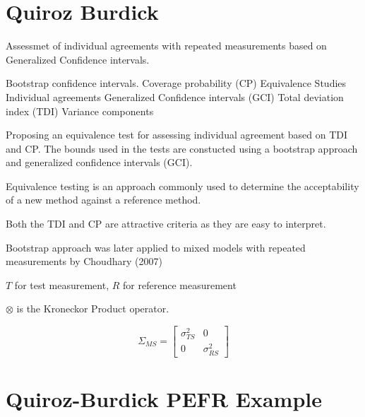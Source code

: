 \section{Quiroz Burdick}
Assessmet of individual agreements with repeated measurements based on Generalized Confidence intervals.


Bootstrap confidence intervals.
Coverage probability (CP)
Equivalence Studies
Individual agreements
Generalized Confidence intervals (GCI)
Total deviation index (TDI)
Variance components

Proposing an equivalence test for assessing individual agreement based on TDI and CP.
The bounds used in the tests are constucted using a bootstrap approach and generalized confidence intervals (GCI).


Equivalence testing is an approach commonly used to determine the acceptability of a new method 
against a reference method.


Both the TDI and CP are attractive criteria as they are easy to interpret.

Bootstrap approach was later applied to mixed models with repeated measurements by Choudhary (2007)

$T$ for test measurement, $R$ for reference measurement


$\otimes$ is the Kroneckor Product operator.

\[  \Sigma_{MS} =  \left[     \begin{array}{cc} \sigma^2_{TS} & 0 \\ 0 & \sigma^2_{RS} \end{array}\right] \]



\section{Quiroz-Burdick PEFR Example}

